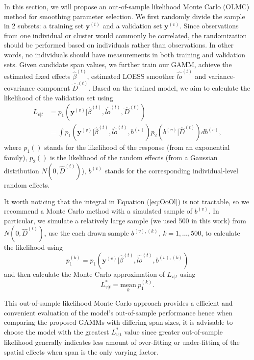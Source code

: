 	In this section, we will propose an out-of-sample likelihood Monte Carlo (OLMC) method for smoothing parameter selection. We first randomly divide the sample in 2 subsets: a training set $\mathbf{y}^{(t)}$ and a validation set $\mathbf{y}^{(v)}$. Since observations from one individual or cluster would commonly be correlated, the randomization should be performed based on individuals rather than observations. In other words, no individuals should have measurements in both training and validation sets. Given candidate span values, we further train our GAMM, achieve the estimated fixed effects ${\hat{\beta}}^{(t)}$, estimated LOESS smoother ${\hat{lo}}^{(t)}$ and variance-covariance component $\hat{D}^{(t)}$. Based on the trained model, we aim to calculate the likelihood of the validation set using 
	\begin{equation} \label{eq:OoOl}
	\begin{split}
	L_{v|t}  &= p_1(\mathbf{y}^{(v)}|{\hat{\beta}}^{(t)}, {\hat{lo}}^{(t)}, \hat{D}^{(t)}) \\
	&= \int p_1(\mathbf{y}^{(v)}|{\hat{\beta}}^{(t)}, {\hat{lo}}^{(t)}, b^{(v)})p_2(b^{(v)}|\hat{D}^{(t)}) db^{(v)},
	\end{split}
	\end{equation}
	where $p_1()$ stands for the likelihood of the response (from an exponential family), $p_2()$ is the likelihood of the random effects (from a Gaussian distribution $N(0,\hat{D}^{(t)})$), $b^{(v)}$ stands for the corresponding individual-level random effects. 
	
	It worth noticing that the integral in Equation (\ref{eq:OoOl}) is not tractable, so we recommend a Monte Carlo method with a simulated sample of $b^{(v)}$. In particular, we simulate a relatively large sample (we used 500 in this work) from $N(0,\hat{D}^{(t)})$, use the each drawn sample $b^{(v), (k)},\ k=1,\dots,500$, to calculate the likelihood using 
	\begin{equation} \label{eq:p1k}
	p_1^{(k)}=p_1(\mathbf{y}^{(v)}|{\hat{\beta}}^{(t)}, {\hat{lo}}^{(t)}, b^{(v),(k)})
	\end{equation}
	and then calculate the Monte Carlo approximation of $L_{v|t}$ using 
	\begin{equation} \label{eq:MCL}
	L_{v|t}^*= \underset{k}{\text{mean}}\ p_1^{(k)}.
	\end{equation}
	
	This out-of-sample likelihood Monte Carlo approach provides a efficient and convenient evaluation of the model's out-of-sample performance hence when comparing the proposed GAMMs with differing span sizes, it is advisable to choose the model with the greatest $L_{v|t}^*$ value since greater out-of-sample likelihood generally indicates less amount of over-fitting or under-fitting of the spatial effects when span is the only varying factor. 
	
